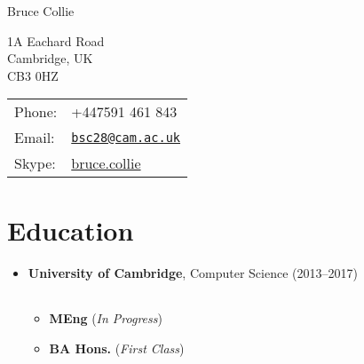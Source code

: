 \documentclass[letterpaper]{article}
\def\name{Bruce Collie}
\begin{document}
{\huge \name}


\vspace{0.25in}

\begin{minipage}{0.45\linewidth}
  1A Eachard Road \\
  Cambridge, UK \\
  CB3 0HZ
\end{minipage}
\begin{minipage}{0.45\linewidth}
  \begin{tabular}{ll}
    Phone: & +447591 461 843 \\
    Email: & \href{mailto:bsc28@cam.ac.uk}{\tt bsc28@cam.ac.uk} \\
    Skype: & \href{skype:bruce.collie}{bruce.collie}
  \end{tabular}
\end{minipage}

\section*{Education}

\begin{itemize}
  \item \textbf{University of Cambridge}, Computer Science (2013--2017)
        \begin{tabular}{c}
        \end{tabular}
        \begin{itemize}
            \item \textbf{MEng} (\emph{In Progress})
            \item \textbf{BA Hons.} (\emph{First Class})
        \end{itemize}
\end{itemize}
\end{document}
